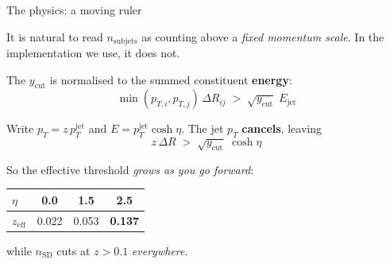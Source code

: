 \documentclass[aspectratio=169,10pt]{beamer}
\newcommand{\sdc}[1]{\textcolor{sdorange}{#1}}
\begin{document}
\begin{frame}{The physics: a moving ruler}

It is natural to read $n_{\mathrm{subjets}}$ as counting above a \emph{fixed
momentum scale}. In the implementation we use, it does not.

\vspace{0.6em}
The $y_{\mathrm{cut}}$ is normalised to the summed constituent
\textbf{energy}:
\[
\min(p_{T,i}, p_{T,j})\,\Delta R_{ij} \;>\; \sqrt{y_{\mathrm{cut}}}\;E_{\mathrm{jet}}
\]

Write $p_T = z\,p_T^{\mathrm{jet}}$ and $E = p_T^{\mathrm{jet}}\cosh\eta$.
The jet $p_T$ \textbf{cancels}, leaving
\[
\boxed{\;z\,\Delta R \;>\; \sqrt{y_{\mathrm{cut}}}\;\cosh\eta\;}
\]

\vspace{0.6em}
So the effective threshold \emph{grows as you go forward}:

\centering
\begin{tabular}{lccc}
\toprule
$\eta$ & 0.0 & 1.5 & 2.5 \\
\midrule
$z_{\mathrm{eff}}$ & 0.022 & 0.053 & \textbf{0.137} \\
\bottomrule
\end{tabular}

\vspace{0.6em}
\flushleft
while \sdc{$n_{\mathrm{SD}}$} cuts at $z > 0.1$ \emph{everywhere}.

\end{frame}
\end{document}
